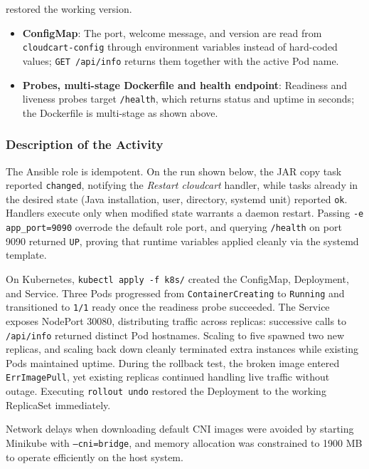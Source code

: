 \documentclass[12pt,a4paper]{article}
\begin{document}
\newpage

restored the working version.
\begin{itemize}[nosep]
    \item \textbf{ConfigMap}: The port, welcome message, and version are read from \texttt{cloudcart-config} through environment variables instead of hard-coded values; \texttt{GET /api/info} returns them together with the active Pod name.
    \item \textbf{Probes, multi-stage Dockerfile and health endpoint}: Readiness and liveness probes target \texttt{/health}, which returns status and uptime in seconds; the Dockerfile is multi-stage as shown above.
\end{itemize}

\subsubsection*{Description of the Activity}
The Ansible role is idempotent. On the run shown below, the JAR copy task reported \texttt{changed}, notifying the \textit{Restart cloudcart} handler, while tasks already in the desired state (Java installation, user, directory, systemd unit) reported \texttt{ok}. Handlers execute only when modified state warrants a daemon restart. Passing \texttt{-e app\_port=9090} overrode the default role port, and querying \texttt{/health} on port 9090 returned \texttt{UP}, proving that runtime variables applied cleanly via the systemd template.

On Kubernetes, \texttt{kubectl apply -f k8s/} created the ConfigMap, Deployment, and Service. Three Pods progressed from \texttt{ContainerCreating} to \texttt{Running} and transitioned to \texttt{1/1} ready once the readiness probe succeeded. The Service exposes NodePort 30080, distributing traffic across replicas: successive calls to \texttt{/api/info} returned distinct Pod hostnames. Scaling to five spawned two new replicas, and scaling back down cleanly terminated extra instances while existing Pods maintained uptime. During the rollback test, the broken image entered \texttt{ErrImagePull}, yet existing replicas continued handling live traffic without outage. Executing \texttt{rollout undo} restored the Deployment to the working ReplicaSet immediately.

Network delays when downloading default CNI images were avoided by starting Minikube with \texttt{--cni=bridge}, and memory allocation was constrained to 1900 MB to operate efficiently on the host system.
\end{document}
